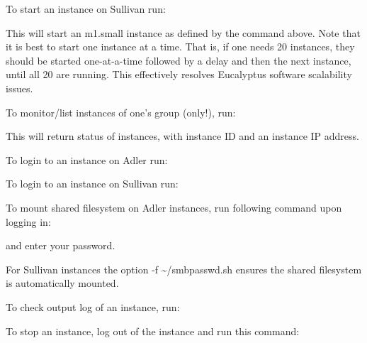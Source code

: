 \documentclass[letterpaper,10pt,english]{sphinxmanual}
\begin{document}
To start an instance on Sullivan run:
\begin{quote}

\end{quote}

This will start an m1.small instance as defined by the command above. Note that it is best to start one instance at a time. That is, if one needs 20 instances, they should be started one-at-a-time followed by a delay and then the next instance, until all 20 are running. This effectively resolves Eucalyptus software scalability issues.

To monitor/list instances of one’s group (only!), run:
\begin{quote}

\end{quote}

This will return status of instances, with instance ID and an instance IP address.

To login to an instance on Adler run:
\begin{quote}

\end{quote}

To login to an instance on Sullivan run:
\begin{quote}

\end{quote}

To mount shared filesystem on Adler instances, run following command upon logging in:
\begin{quote}

\end{quote}

and enter your password.

For Sullivan instances the option -f \textasciitilde{}/smbpasswd.sh ensures the shared filesystem is automatically mounted.

To check output log of an instance, run:
\begin{quote}

\end{quote}

To stop an instance, log out of the instance and run this command:
\begin{quote}

\end{quote}
\end{document}
